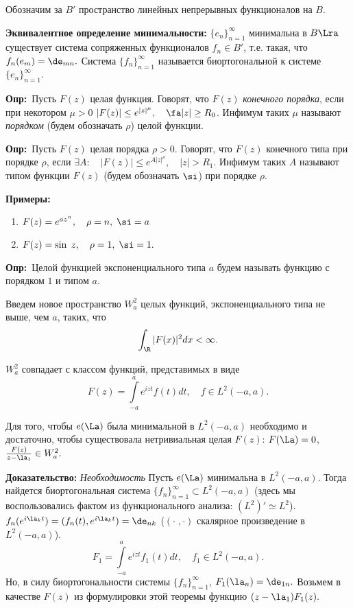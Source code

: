 \documentclass[a4paper]{article}
\def\defin{\noindent\textbf{Опр:}\ }
\begin{document}
Обозначим за $B'$ пространство линейных непрерывных функционалов
на $B.$

\noindent\textbf{Эквивалентное определение минимальности:}
$\{e_n\}_{n=1}^{\infty}$ минимальна в $B\Lra$
существует система сопряженных функционалов $f_n\in B'$, т.е.
такая, что $f_n(e_m)=\de_{mn}.$ Система
$\{f_n\}_{n=1}^{\infty}$ называется биортогональной к системе
$\{e_n\}_{n=1}^{\infty}.$

\defin Пусть $F(z)$ целая функция. Говорят, что
$F(z)$ \emph{конечного порядка}, если при некотором $\mu>0$
$|F(z)|\le e^{|z|^{\mu}},\quad\fa |z|\ge R_0$. Инфимум таких
$\mu$ называют \emph{порядком} (будем обозначать $\rho$) целой
функции.

\defin Пусть $F(z)$ целая порядка $\rho>0.$
Говорят, что $F(z)$ конечного типа при порядке $\rho$, если
$\exi A:\quad|F(z)|\le e^{A|z|^{\rho}},\quad|z|>R_1.$ Инфимум
таких $A$ называют типом функции $F(z)$ (будем обозначать
$\si$) при порядке $\rho.$

\noindent\textbf{Примеры:}
\begin{enumerate}
\item
$F(z)=e^{az^n},\quad\rho=n,\;\si=a$
\item
$F(z)=\sin\;z,\quad\rho=1,\;\si=1.$
\end{enumerate}

\defin Целой функцией экспоненциального типа $a$
будем называть функцию с порядком $1$ и типом $a$.

Введем новое пространство $W^2_a$ целых функций, экспоненциального
типа не выше, чем $a$, таких, что
$$\int_{\R }|F(x)|^2dx<\infty.$$

\begin{theorems}
$W^2_a$ совпадает с классом функций, представимых в виде
$$F(z)=\int\limits_{-a}^ae^{izt}f(t)dt,\quad f\in L^2(-a,a).$$
\end{theorems}

\begin{theorems}
Для того, чтобы $e(\La)$ была минимальной в $L^2(-a,a)$
необходимо и достаточно, чтобы существовала нетривиальная целая
$F(z)$: $F(\La)=0$, $\frac {F(z)}{z-\la_1}\in W^2_a.$
\end{theorems}
\textbf{Доказательство:} \emph{Необходимость} Пусть $e(\La)$
минимальна в $L^2(-a,a)$. Тогда найдется биортогональная система
$\{f_n\}_{n=1}^{\infty}\subset L^2(-a,a)$ (здесь мы
воспользовались фактом из функционального анализа: $(L^2)'\simeq
L^2$). $f_n(e^{i\la_k t})=(f_n(t),e^{i\la_k
t})=\de_{nk}$ ($(\cdot\;,\cdot)$ скалярное произведение в
$L^2(-a,a)$).
$$F_1=\int\limits_{-a}^ae^{izt}f_1(t)dt,\quad f_1\in L^2(-a,a).$$
Но, в силу биортогональности системы $\{f_n\}_{n=1}^{\infty}$,
$F_1(\la_n)=\de_{1n}.$ Возьмем в качестве $F(z)$ из
формулировки этой теоремы функцию $(z-\la_1)F_1(z).$
\end{document}
